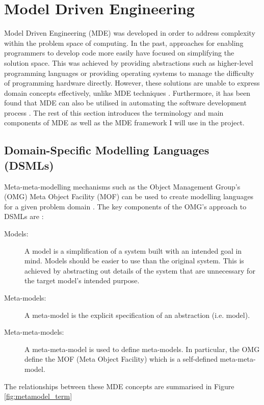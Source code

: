 \documentclass{UoYCSproject}
\begin{document}
\section{Model Driven Engineering} \label{mde_bg}
Model Driven Engineering (MDE) was developed in order to address complexity within the problem space of computing. In the past, approaches for enabling programmers to develop code more easily have focused on simplifying the solution space. This was achieved by providing abstractions such as higher-level programming languages or providing operating systems to manage the difficulty of programming hardware directly. However, these solutions are unable to express domain concepts effectively, unlike MDE techniques \parencite{schmidt2006model}. Furthermore, it has been found that MDE can also be utilised in automating the software development process \parencite{bezivin2004search}.
\newline
The rest of this section introduces the terminology and main components of MDE as well as the MDE framework I will use in the project.

\subsection{Domain-Specific Modelling Languages (DSMLs)}
Meta-meta-modelling mechanisms such as the Object Management Group's (OMG) Meta Object Facility (MOF) can be used to create modelling languages for a given problem domain \parencite{mussbacher2014relevance}. The key components of the OMG's approach to DSMLs are \parencite{bezivin2001towards}:
\begin{description}
\item[Models:] A model is a simplification of a system built with an intended goal in mind. Models should be easier to use than the original system. This is achieved by abstracting out details of the system that are unnecessary for the target model's intended purpose.
\item[Meta-models:] A meta-model is the explicit specification of an abstraction (i.e. model). 
\item[Meta-meta-models:]  A meta-meta-model is used to define meta-models. In particular, the OMG define the MOF (Meta Object Facility) which is a self-defined meta-meta-model.
\end{description}

The relationships between these MDE concepts are summarised in Figure \ref{fig:metamodel_term}
\end{document}
